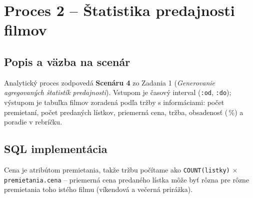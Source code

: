 \documentclass[11pt, a4paper]{article}
\begin{document}
\newpage
\section{Proces 2 -- Štatistika predajnosti filmov}
\label{sec:proces2}

\subsection{Popis a väzba na scenár}

Analytický proces zodpovedá \textbf{Scenáru 4} zo Zadania 1
(\emph{Generovanie agregovaných štatistík predajnosti}). Vstupom je časový
interval (\texttt{:od}, \texttt{:do}); výstupom je tabuľka filmov zoradená
podľa tržby s informáciami: počet premietaní, počet predaných lístkov,
priemerná cena, tržba, obsadenosť (\,\%) a poradie v rebríčku.

\subsection{SQL implementácia}

Cena je atribútom premietania, takže tržbu počítame ako
\texttt{COUNT(listky)} $\times$ \texttt{premietania.cena} -- priemerná cena
predaného lístka môže byť rôzna pre rôzne premietania toho istého filmu
(víkendová a večerná prirážka).
\end{document}
